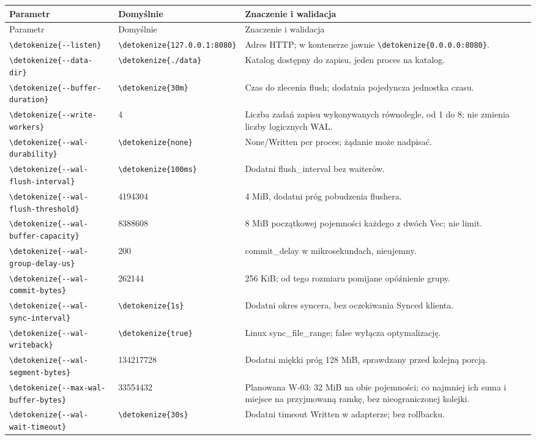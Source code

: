 \documentclass[11pt,a4paper]{article}
\newcommand{\code}[1]{\expandafter\nolinkurl\expandafter{\detokenize{#1}}}
\newcommand{\tabhead}[1]{\toprule #1\\ \midrule\endfirsthead
  \toprule #1\\ \midrule\endhead \bottomrule\endfoot}
\begin{document}
\begin{longtable}{P{54mm}P{25mm}P{77mm}}
\tabhead{Parametr & Domyślnie & Znaczenie i walidacja}
\code{--listen} & \code{127.0.0.1:8080} &
Adres HTTP; w kontenerze jawnie \code{0.0.0.0:8080}.\\
\code{--data-dir} & \code{./data} & Katalog dostępny do zapisu,
jeden proces na katalog.\\
\code{--buffer-duration} & \code{30m} &
Czas do zlecenia flush; dodatnia pojedyncza jednostka czasu.\\
\code{--write-workers} & 4 &
Liczba zadań zapisu wykonywanych równolegle, od 1 do 8;
nie zmienia liczby logicznych WAL.\\
\code{--wal-durability} & \code{none} &
None/Written per proces; żądanie może nadpisać.\\
\code{--wal-flush-interval} & \code{100ms} &
Dodatni flush\_interval bez waiterów.\\
\code{--wal-flush-threshold} & 4194304 &
4 MiB, dodatni próg pobudzenia flushera.\\
\code{--wal-buffer-capacity} & 8388608 &
8 MiB początkowej pojemności każdego z dwóch Vec; nie limit.\\
\code{--wal-group-delay-us} & 200 &
commit\_delay w mikrosekundach, nieujemny.\\
\code{--wal-commit-bytes} & 262144 &
256 KiB; od tego rozmiaru pomijane opóźnienie grupy.\\
\code{--wal-sync-interval} & \code{1s} &
Dodatni okres syncera, bez oczekiwania Synced klienta.\\
\code{--wal-writeback} & \code{true} &
Linux sync\_file\_range; false wyłącza optymalizację.\\
\code{--wal-segment-bytes} & 134217728 &
Dodatni miękki próg 128 MiB, sprawdzany przed kolejną porcją.\\
\code{--max-wal-buffer-bytes} & 33554432 &
Planowana W-03: 32 MiB na obie pojemności; co najmniej ich suma
i miejsce na przyjmowaną ramkę, bez nieograniczonej kolejki.\\
\code{--wal-wait-timeout} & \code{30s} &
Dodatni timeout Written w adapterze; bez rollbacku.\\


\end{longtable}
\end{document}
